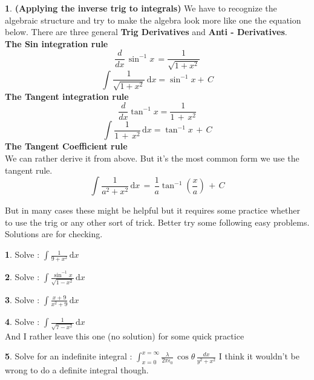 \documentclass[11pt,a4paper,twocolumn]{article}
\theoremstyle{definition}
\newtheorem{fct}{ \framebox[0.05\textwidth]{Fact} }
\theoremstyle{definition}
\newtheorem{pr}{ \framebox[0.05\textwidth]{Pr} }
\theoremstyle{definition}
\theoremstyle{definition}
\begin{document}
\begin{fct} \textbf{(Applying the inverse trig to integrals)}
We have to recognize the algebraic structure and try to make the algebra look more like one the equation below. There are three general \textbf{Trig Derivatives} and \textbf{Anti - Derivatives}.\\
\textbf{\textsf{The Sin integration rule}}
\begin{equation}
\frac{d}{dx} \, \sin^{-1} x \, = \frac{1}{\sqrt{1 + x^2}}
\end{equation}
\[
\int  \frac{1}{\sqrt{1 + x^2}}\, \mathrm{d}x = \sin ^{-1}x + \, C
\] 
\textbf{\textsf{The Tangent integration rule}}
\begin{equation}
\frac{d}{dx} \tan ^{-1}x = \frac{1}{1 \, + \, x^2}
\end{equation} 
\[\int \frac{1}{1 \, + \, x^2} \, \mathrm{d}x = \tan ^{-1}x \, + \, C\]
\textbf{\textsf{The Tangent Coefficient rule}} \\
We can rather derive it from above. But it's the most common form we use the tangent rule.
\[\int \frac{1}{a^2 + x^2} \, \mathrm{d}x \,=\, \frac{1}{a} \tan ^{-1} (\frac{x}{a}) \,+\, C
\]
\end{fct}
But in many cases these might be helpful but it requires some practice whether to use the trig or any other sort of trick. Better try some following easy problems. Solutions are for checking.
\begin{pr}
Solve : $ \int \frac{1}{9+x^2} \, \mathrm{d}x$
\end{pr}

\begin{pr}
Solve : $ \int \frac{\sin ^{-1}x}{\sqrt{1 - x^2}} \, \mathrm{d} x $
\end{pr}

\begin{pr}
Solve : $ \int \frac{x+9}
								{x^{2} + 9} \, \mathrm{d}x $
\end{pr}

\begin{pr}
		Solve : $ \int \frac{1}
		{\sqrt{7 - x^{2}   }} \, \mathrm{d} x
		$\\
		And I rather leave this one (no solution) for some quick practice
		\end{pr}
		
		\begin{pr}
		Solve for an indefinite integral : $ \int_{x=0} ^{x=\infty}
			\frac{\lambda}
			{2 \pi \epsilon_0} \, \cos\theta \, \frac{dx}{y^2 + x^2} $
			I think it wouldn't be wrong to do a definite integral though.
			\end{pr}
\end{document}
